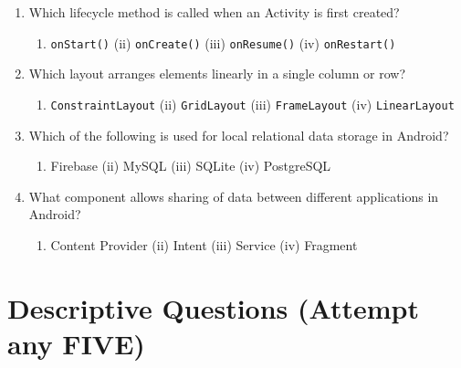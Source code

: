 \documentclass[11pt,a4paper]{article}
\begin{document}
\begin{enumerate}[label=(\alph*)]
\begin{enumerate}[label=(\roman*)]
        \item Broadcast Receiver \quad (ii) Service \quad (iii) Activity \quad (iv) Content Provider
    \end{enumerate}

    \item Which lifecycle method is called when an Activity is first created?
    
\begin{enumerate}[label=(\roman*)]
        \item   \texttt{onStart()} \quad (ii)   \texttt{onCreate()} \quad (iii)   \texttt{onResume()} \quad (iv)   \texttt{onRestart()}
    \end{enumerate}

    \item Which layout arranges elements linearly in a single column or row?
    
\begin{enumerate}[label=(\roman*)]
        \item   \texttt{ConstraintLayout} \quad (ii)   \texttt{GridLayout} \quad (iii)   \texttt{FrameLayout} \quad (iv)   \texttt{LinearLayout}
    \end{enumerate}

    \item Which of the following is used for local relational data storage in Android?
    
\begin{enumerate}[label=(\roman*)]
        \item Firebase \quad (ii) MySQL \quad (iii) SQLite \quad (iv) PostgreSQL
    \end{enumerate}

    \item What component allows sharing of data between different applications in Android?
    
\begin{enumerate}[label=(\roman*)]
        \item Content Provider \quad (ii) Intent \quad (iii) Service \quad (iv) Fragment
    \end{enumerate}
\end{enumerate}

\section*{Descriptive Questions (Attempt any FIVE)}
\end{document}
